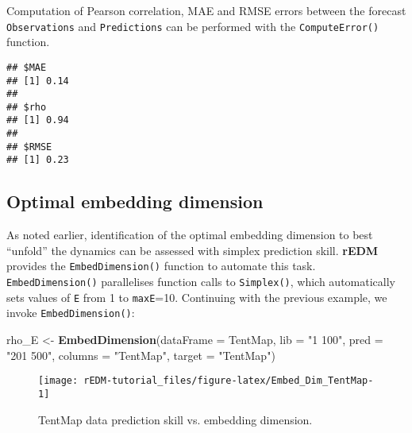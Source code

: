 \documentclass[]{article}
\newenvironment{Shaded}{\begin{snugshade}}{\end{snugshade}}
\newcommand{\DataTypeTok}[1]{\textcolor[rgb]{0.13,0.29,0.53}{#1}}
\newcommand{\KeywordTok}[1]{\textcolor[rgb]{0.13,0.29,0.53}{\textbf{#1}}}
\newcommand{\NormalTok}[1]{#1}
\newcommand{\OperatorTok}[1]{\textcolor[rgb]{0.81,0.36,0.00}{\textbf{#1}}}
\newcommand{\StringTok}[1]{\textcolor[rgb]{0.31,0.60,0.02}{#1}}
\begin{document}
Computation of Pearson correlation, MAE and RMSE errors between the
forecast \texttt{Observations} and \texttt{Predictions} can be performed
with the \texttt{ComputeError()} function.

\begin{Shaded}
\end{Shaded}

\begin{verbatim}
## $MAE
## [1] 0.14
## 
## $rho
## [1] 0.94
## 
## $RMSE
## [1] 0.23
\end{verbatim}

\hypertarget{optimal-embedding-dimension}{%
\subsection{Optimal embedding
dimension}\label{optimal-embedding-dimension}}

As noted earlier, identification of the optimal embedding dimension to
best ``unfold'' the dynamics can be assessed with simplex prediction
skill. \textbf{rEDM} provides the \texttt{EmbedDimension()} function to
automate this task. \texttt{EmbedDimension()} parallelises function
calls to \texttt{Simplex()}, which automatically sets values of
\texttt{E} from 1 to \texttt{maxE}=10. Continuing with the previous
example, we invoke \texttt{EmbedDimension()}:

\begin{Shaded}
\begin{Highlighting}[]
\NormalTok{rho_E <-}\StringTok{ }\KeywordTok{EmbedDimension}\NormalTok{(}\DataTypeTok{dataFrame =}\NormalTok{ TentMap, }\DataTypeTok{lib =} \StringTok{"1 100"}\NormalTok{, }\DataTypeTok{pred =} \StringTok{"201 500"}\NormalTok{, }\DataTypeTok{columns =} \StringTok{"TentMap"}\NormalTok{, }
    \DataTypeTok{target =} \StringTok{"TentMap"}\NormalTok{)}
\end{Highlighting}
\end{Shaded}

\begin{figure}[h]

{\centering \texttt{[image: rEDM-tutorial\_files/figure-latex/Embed\_Dim\_TentMap-1]} 

}

\caption{TentMap data prediction skill vs. embedding dimension.}\label{fig:Embed_Dim_TentMap}
\end{figure}
\end{document}
